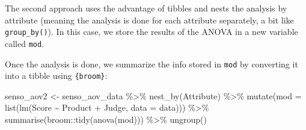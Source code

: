 \documentclass[
]{krantz}
\makeatletter
\newenvironment{Shaded}{\begin{snugshade}}{\end{snugshade}}
\newcommand{\AttributeTok}[1]{\textcolor[rgb]{0.61,0.61,0.61}{#1}}
\newcommand{\ControlFlowTok}[1]{\textcolor[rgb]{0.27,0.27,0.27}{\textbf{#1}}}
\newcommand{\FunctionTok}[1]{\textcolor[rgb]{0,0,0}{#1}}
\newcommand{\NormalTok}[1]{#1}
\newcommand{\OtherTok}[1]{\textcolor[rgb]{0.37,0.37,0.37}{#1}}
\newcommand{\SpecialCharTok}[1]{\textcolor[rgb]{0,0,0}{#1}}
\newcommand{\StringTok}[1]{\textcolor[rgb]{0.5,0.5,0.5}{#1}}
\newenvironment{kframe}{%
\medskip{}
\setlength{\fboxsep}{.8em}
 \def\at@end@of@kframe{}%
 \ifinner\ifhmode%
  \def\at@end@of@kframe{\end{minipage}}%
  \begin{minipage}{\columnwidth}%
 \fi\fi%
 \def\FrameCommand##1{\hskip\@totalleftmargin \hskip-\fboxsep
 \colorbox{shadecolor}{##1}\hskip-\fboxsep
     \hskip-\linewidth \hskip-\@totalleftmargin \hskip\columnwidth}%
 \MakeFramed {\advance\hsize-\width
   \@totalleftmargin\z@ \linewidth\hsize
   \@setminipage}}%
 {\par\unskip\endMakeFramed%
 \at@end@of@kframe}
\renewenvironment{Shaded}{\begin{kframe}}{\end{kframe}}
\makeatother
\begin{document}
\begin{Shaded}
\end{Shaded}

The second approach uses the advantage of tibbles and nests the analysis by attribute (meaning the analysis is done for each attribute separately, a bit like \texttt{group\_by()}). In this case, we store the results of the ANOVA in a new variable called \texttt{mod}.

Once the analysis is done, we summarize the info stored in \texttt{mod} by converting it into a tibble using \texttt{\{broom\}}:

\begin{Shaded}
\begin{Highlighting}[]
\NormalTok{senso\_aov2 }\OtherTok{\textless{}{-}}\NormalTok{ senso\_aov\_data }\SpecialCharTok{\%\textgreater{}\%}
  \FunctionTok{nest\_by}\NormalTok{(Attribute) }\SpecialCharTok{\%\textgreater{}\%}
  \FunctionTok{mutate}\NormalTok{(}\AttributeTok{mod =} \FunctionTok{list}\NormalTok{(}\FunctionTok{lm}\NormalTok{(Score }\SpecialCharTok{\textasciitilde{}}\NormalTok{ Product }\SpecialCharTok{+}\NormalTok{ Judge, }\AttributeTok{data =}\NormalTok{ data))) }\SpecialCharTok{\%\textgreater{}\%}
  \FunctionTok{summarise}\NormalTok{(broom}\SpecialCharTok{::}\FunctionTok{tidy}\NormalTok{(}\FunctionTok{anova}\NormalTok{(mod))) }\SpecialCharTok{\%\textgreater{}\%}
  \FunctionTok{ungroup}\NormalTok{()}
\end{Highlighting}
\end{Shaded}
\end{document}
